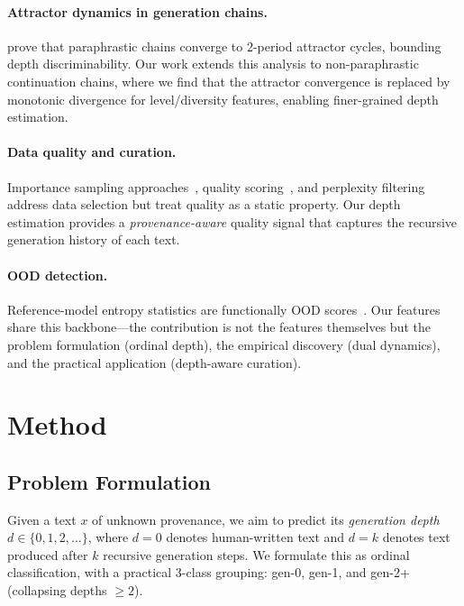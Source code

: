 \documentclass[letterpaper]{article}
\begin{document}
\paragraph{Attractor dynamics in generation chains.}
\citet{bertrand2023stability} prove that paraphrastic chains converge to 2-period attractor cycles, bounding depth discriminability.
Our work extends this analysis to non-paraphrastic continuation chains, where we find that the attractor convergence is replaced by monotonic divergence for level/diversity features, enabling finer-grained depth estimation.

\paragraph{Data quality and curation.}
Importance sampling approaches~\citep{xie2023dsir}, quality scoring~\citep{wettig2024qurating}, and perplexity filtering~\citep{wenzek2020ccnet} address data selection but treat quality as a static property.
Our depth estimation provides a \emph{provenance-aware} quality signal that captures the recursive generation history of each text.

\paragraph{OOD detection.}
Reference-model entropy statistics are functionally OOD scores~\citep{hendrycks2017baseline,liang2018enhancing}.
Our features share this backbone---the contribution is not the features themselves but the problem formulation (ordinal depth), the empirical discovery (dual dynamics), and the practical application (depth-aware curation).

\section{Method}

\subsection{Problem Formulation}

Given a text $x$ of unknown provenance, we aim to predict its \emph{generation depth} $d \in \{0, 1, 2, \ldots\}$, where $d{=}0$ denotes human-written text and $d{=}k$ denotes text produced after $k$ recursive generation steps.
We formulate this as ordinal classification, with a practical 3-class grouping: gen-0, gen-1, and gen-2+ (collapsing depths $\geq 2$).
\end{document}
